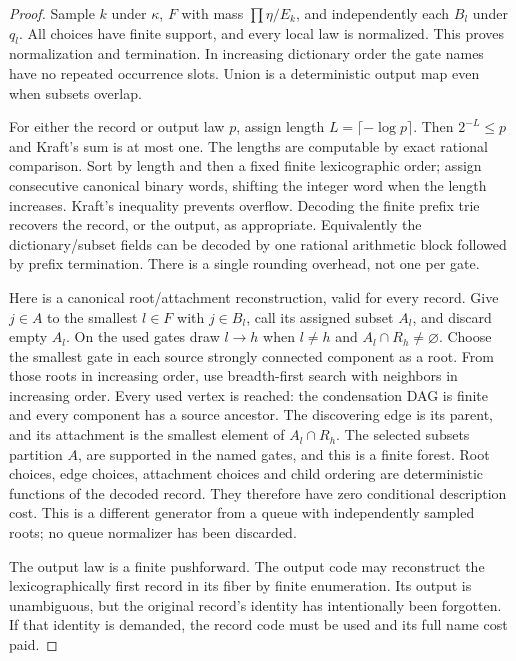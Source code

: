 \documentclass{article}
\begin{document}
\begin{proof}
Sample $k$ under $\kappa$, $F$ with mass $\prod\eta/E_k$, and independently each $B_l$ under $q_l$. All choices have finite support, and every local law is normalized. This proves normalization and termination. In increasing dictionary order the gate names have no repeated occurrence slots. Union is a deterministic output map even when subsets overlap.

For either the record or output law $p$, assign length $L=\lceil-\log p\rceil$. Then $2^{-L}\le p$ and Kraft's sum is at most one. The lengths are computable by exact rational comparison. Sort by length and then a fixed finite lexicographic order; assign consecutive canonical binary words, shifting the integer word when the length increases. Kraft's inequality prevents overflow. Decoding the finite prefix trie recovers the record, or the output, as appropriate. Equivalently the dictionary/subset fields can be decoded by one rational arithmetic block followed by prefix termination. There is a single rounding overhead, not one per gate.

Here is a canonical root/attachment reconstruction, valid for every record. Give $j\in A$ to the smallest $l\in F$ with $j\in B_l$, call its assigned subset $A_l$, and discard empty $A_l$. On the used gates draw $l\to h$ when $l\ne h$ and $A_l\cap R_h\ne\varnothing$. Choose the smallest gate in each source strongly connected component as a root. From those roots in increasing order, use breadth-first search with neighbors in increasing order. Every used vertex is reached: the condensation DAG is finite and every component has a source ancestor. The discovering edge is its parent, and its attachment is the smallest element of $A_l\cap R_h$. The selected subsets partition $A$, are supported in the named gates, and this is a finite forest. Root choices, edge choices, attachment choices and child ordering are deterministic functions of the decoded record. They therefore have zero conditional description cost. This is a different generator from a queue with independently sampled roots; no queue normalizer has been discarded.

The output law is a finite pushforward. The output code may reconstruct the lexicographically first record in its fiber by finite enumeration. Its output is unambiguous, but the original record's identity has intentionally been forgotten. If that identity is demanded, the record code must be used and its full name cost paid.
\end{proof}
\end{document}
